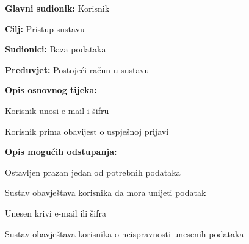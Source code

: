 					\noindent {}
					\begin{packed_item}
						
						\item \textbf{Glavni sudionik:} Korisnik
						\item  \textbf{Cilj:} Pristup sustavu
						\item  \textbf{Sudionici:} Baza podataka
						\item  \textbf{Preduvjet:} Postojeći račun u sustavu
						\item  \textbf{Opis osnovnog tijeka:}
						
						\item[] \begin{packed_enum}
							
							\item Korisnik unosi e-mail i šifru
							\item Korisnik prima obavijest o uspješnoj prijavi
							
						\end{packed_enum}
						
						\item  \textbf{Opis mogućih odstupanja:}
						
						\item[] \begin{packed_item}
							
							\item[1.a] Ostavljen prazan jedan od potrebnih podataka
							\item[] \begin{packed_enum}
								
								\item Sustav obavještava korisnika da mora unijeti podatak
								
							\end{packed_enum}
							\item[1.b] Unesen krivi e-mail ili šifra
							\item[] \begin{packed_enum}
								
								\item Sustav obavještava korisnika o neispravnosti unesenih podataka
								
							\end{packed_enum}
							
						\end{packed_item}
					\end{packed_item}
		
